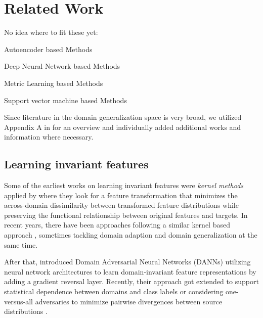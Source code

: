 \section{Related Work}

No idea where to fit these yet: 

\citep{VolpiM19} 
\citep{QiaoZP20}
\citep{MatsuuraH20}
\citep{yao2019adversarial}
\citep{bellot2020generalization}
\citep{jin2020feature}
\citep{somavarapu2020frustratingly}
\citep{deng2020representation}
\citep{mahajan2020domain}
\citep{ilse2019diva}
\citep{arjovsky2019invariant}

Autoencoder based Methods
\citep{LiPWK18}





Deep Neural Network based Methods
\citep{seo2019learning}
\citep{wang2020learning}
\citep{du2020learning}
\citep{huang2020selfchallenging}
\citep{zhou2020learning}
\citep{Jia_2020_CVPR_SSDG}
\citep{LiZYLSH19}
\citep{CarlucciDBCT19}
\citep{LiTGLLZT18}
\citep{DingF18}
\citep{MotiianPAD17}
\citep{LiYSH17}
\citep{piratla2020efficient}
\citep{RyuK0L20}
\citep{RahmanFBS20}
\citep{ShankarPCCJS18}


Metric Learning based Methods
\citep{FangXR13}


Support vector machine based Methods
\citep{NiuLXC18}
\citep{XuLNX14}

Since literature in the domain generalization space is very broad, we utilized Appendix A in \citet{gulrajani2020search} for an overview and individually added additional works and information where necessary.  

\subsection{Learning invariant features}

Some of the earliest works on learning invariant features were \emph{kernel methods} applied by \citet{MuandetBS13}  where they look for a feature transformation that minimizes the across-domain dissimilarity between transformed feature distributions while preserving the functional relationship between original features and targets. In recent years, there have been approaches following a similar kernel based approach \citep{Hu0CC19, LiGTLT18, GhifaryBKZ17}, sometimes tackling domain adaption and domain generalization at the same time.

After that, \citet{GaninUAGLLML16} introduced Domain Adversarial Neural Networks (DANNs) utilizing neural network architectures to learn domain-invariant feature representations by adding a gradient reversal layer. Recently, their approach got extended to support statistical dependence between domains and class labels \citep{AkuzawaIM19} or considering one-versus-all adversaries to minimize pairwise divergences between source distributions \citep{albuquerque2019generalizing}. 

